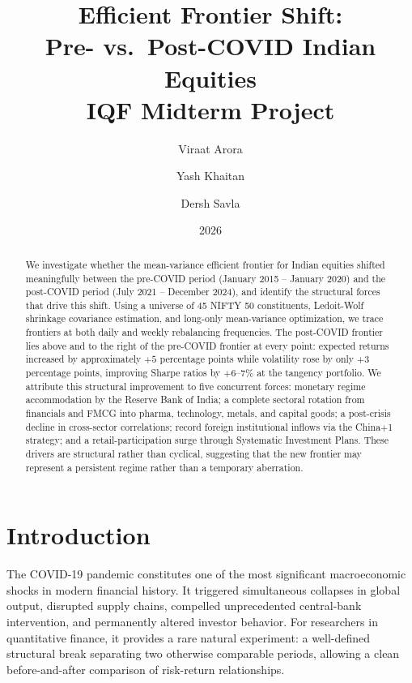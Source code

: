 \documentclass[12pt,a4paper]{article}
\title{\textbf{Efficient Frontier Shift:\\Pre- vs.\ Post-COVID Indian Equities}\\[0.5em]
\large IQF Midterm Project}
\author{Viraat Arora \and Yash Khaitan \and Dersh Savla}
\date{2026}
\begin{document}
\maketitle
\thispagestyle{empty}

\begin{abstract}
We investigate whether the mean-variance efficient frontier for Indian equities shifted
meaningfully between the pre-COVID period (January 2015 -- January 2020) and the
post-COVID period (July 2021 -- December 2024), and identify the structural forces
that drive this shift. Using a universe of 45 NIFTY 50 constituents, Ledoit-Wolf
shrinkage covariance estimation, and long-only mean-variance optimization, we trace
frontiers at both daily and weekly rebalancing frequencies. The post-COVID frontier
lies above and to the right of the pre-COVID frontier at every point: expected returns
increased by approximately $+5$ percentage points while volatility rose by only
$+3$ percentage points, improving Sharpe ratios by $+6$--$7\%$ at the tangency
portfolio. We attribute this structural improvement to five concurrent forces:
monetary regime accommodation by the Reserve Bank of India; a complete sectoral
rotation from financials and FMCG into pharma, technology, metals, and capital goods;
a post-crisis decline in cross-sector correlations; record foreign institutional inflows
via the China$+$1 strategy; and a retail-participation surge through Systematic
Investment Plans. These drivers are structural rather than cyclical, suggesting that
the new frontier may represent a persistent regime rather than a temporary aberration.
\end{abstract}

\newpage
\tableofcontents
\newpage

\section{Introduction}

The COVID-19 pandemic constitutes one of the most significant macroeconomic shocks in
modern financial history. It triggered simultaneous collapses in global output, disrupted
supply chains, compelled unprecedented central-bank intervention, and permanently altered
investor behavior. For researchers in quantitative finance, it provides a rare natural
experiment: a well-defined structural break separating two otherwise comparable periods,
allowing a clean before-and-after comparison of risk-return relationships.
\end{document}
